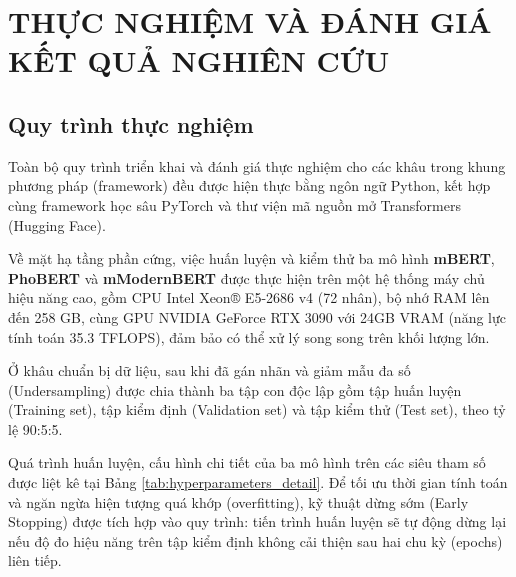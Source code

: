 \chapter{THỰC NGHIỆM VÀ ĐÁNH GIÁ KẾT QUẢ NGHIÊN CỨU}
\label{Chapter4}

\section{Quy trình thực nghiệm}
Toàn bộ quy trình triển khai và đánh giá thực nghiệm cho các khâu trong khung phương pháp (framework) đều được hiện thực bằng ngôn ngữ Python, kết hợp cùng framework học sâu PyTorch và thư viện mã nguồn mở Transformers (Hugging Face).

Về mặt hạ tầng phần cứng, việc huấn luyện và kiểm thử ba mô hình \textbf{mBERT}, \textbf{PhoBERT} và \textbf{mModernBERT} được thực hiện trên một hệ thống máy chủ hiệu năng cao, gồm CPU Intel Xeon® E5-2686 v4 (72 nhân), bộ nhớ RAM lên đến 258 GB, cùng GPU NVIDIA GeForce RTX 3090 với 24GB VRAM (năng lực tính toán 35.3 TFLOPS), đảm bảo có thể xử lý song song trên khối lượng lớn.

Ở khâu chuẩn bị dữ liệu, sau khi đã gán nhãn và giảm mẫu đa số (Undersampling) được chia thành ba tập con độc lập gồm tập huấn luyện (Training set), tập kiểm định (Validation set) và tập kiểm thử (Test set), theo tỷ lệ 90:5:5.

Quá trình huấn luyện, cấu hình chi tiết của ba mô hình trên các siêu tham số được liệt kê tại Bảng \ref{tab:hyperparameters_detail}. Để tối ưu thời gian tính toán và ngăn ngừa hiện tượng quá khớp (overfitting), kỹ thuật dừng sớm (Early Stopping) được tích hợp vào quy trình: tiến trình huấn luyện sẽ tự động dừng lại nếu độ đo hiệu năng trên tập kiểm định không cải thiện sau hai chu kỳ (epochs) liên tiếp.


